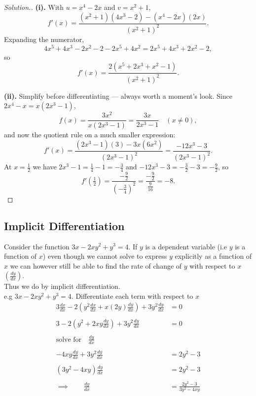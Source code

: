 \documentclass[11pt,a4paper]{article}
\theoremstyle{definition}
\newenvironment{solution}
  {\renewcommand{\qedsymbol}{}\begin{proof}[\textit{Solution}.]}
  {\end{proof}}
\begin{document}
\begin{solution}
\textbf{(i).} With $u=x^{4}-2x$ and $v=x^{2}+1$,
$$f'(x)=\frac{\left(x^{2}+1\right)\left(4x^{3}-2\right)-\left(x^{4}-2x\right)(2x)}
{\left(x^{2}+1\right)^{2}} .$$
Expanding the numerator,
$$4x^{5}+4x^{3}-2x^{2}-2-2x^{5}+4x^{2}=2x^{5}+4x^{3}+2x^{2}-2,$$
so
$$f'(x)=\frac{2\left(x^{5}+2x^{3}+x^{2}-1\right)}{\left(x^{2}+1\right)^{2}} .$$

\textbf{(ii).} Simplify before differentiating --- always worth a moment's look.
Since $2x^{4}-x=x\left(2x^{3}-1\right)$,
$$f(x)=\frac{3x^{2}}{x\left(2x^{3}-1\right)}=\frac{3x}{2x^{3}-1}
\quad (x\neq 0),$$
and now the quotient rule on a much smaller expression:
$$f'(x)=\frac{\left(2x^{3}-1\right)(3)-3x\left(6x^{2}\right)}{\left(2x^{3}-1\right)^{2}}
=\frac{-12x^{3}-3}{\left(2x^{3}-1\right)^{2}} .$$
At $x=\frac{1}{2}$ we have $2x^{3}-1=\frac{1}{4}-1=-\frac{3}{4}$ and
$-12x^{3}-3=-\frac{3}{2}-3=-\frac{9}{2}$, so
$$f'\left(\tfrac{1}{2}\right)=\frac{-\frac{9}{2}}{\left(-\frac{3}{4}\right)^{2}}
=\frac{-\frac{9}{2}}{\frac{9}{16}}=-8 .$$
\end{solution}
\subsection{Implicit Differentiation}
Consider the function $3x-2xy^2+y^3=4$. If $y$ is a dependent variable (i.e $y$ is a function of $x$) even though we cannot solve to express $y$ explicitly as a function of $x$ we can however still be able to find the rate of change of $y$ with respect to $x$ $\left(\frac{dy}{dx}\right)$.\\
Thus we do by implicit differentiation. \\
e.g $3x-2xy^2+y^3=4$. Differentiate each term with respect to $x$
\begin{align*}
3\frac{dx}{dx}-2\left(y^2\frac{dx}{dx}+x(2y)\frac{dy}{dx}\right)+3y^2\frac{dy}{dx} &=0\\\\
3-2\left(y^2+2xy\frac{dy}{dx}\right)+3y^2\frac{dy}{dx} &=0\\\\
\text{solve for}\quad  \frac{dy}{dx}\\\\
-4xy\frac{dy}{dx}+3y^2\frac{dy}{dx} & = 2y^2-3\\\\
\left(3y^2-4xy\right)\frac{dy}{dx} & =2y^2-3\\\\
\implies \qquad  \frac{dy}{dx} & =\frac{2y^2-3}{3y^2-4xy}\\
\end{align*}
\end{document}

